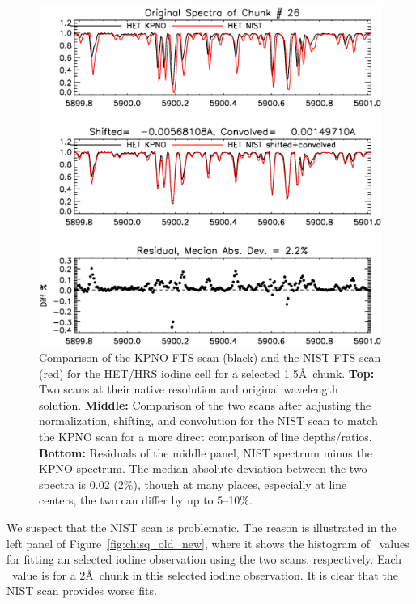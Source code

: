     
\begin{figure}[!th]
\centering
\includegraphics[angle=0.,scale=0.45]{het/compare_het_fts_26.eps}
\caption{Comparison of the KPNO FTS scan (black) and the NIST FTS scan
  (red) for the HET/HRS iodine cell for a selected
  1.5\AA\ chunk. \textbf{Top:} Two scans at their native resolution
  and original wavelength solution. \textbf{Middle:} Comparison of the
  two scans after adjusting the normalization, shifting, and
  convolution for the NIST scan to match the KPNO scan for a more
  direct comparison of line depths/ratios. \textbf{Bottom:} Residuals
  of the middle panel, NIST spectrum minus the KPNO spectrum. The
  median absolute deviation between the two spectra is 0.02
  (2\%), though at many places, especially at line centers, the two
  can differ by up to 5--10\%.
  \label{fig:fts_old_new}}
\end{figure}

We suspect that the NIST scan is problematic. The reason is
illustrated in the left panel of Figure~\ref{fig:chisq_old_new}, where
it shows the histogram of \chisq\ values for fitting an selected iodine
observation using the two scans, respectively. Each \chisq\ value is
for a 2\AA\ chunk in this selected iodine observation. It is clear
that the NIST scan provides worse fits.

